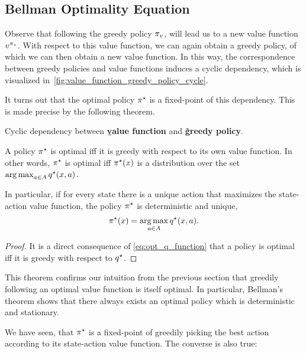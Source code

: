 \subsection{Bellman Optimality Equation}

Observe that following the greedy policy $\pi_{\fnv}$, will lead us to a new value function $\fnv[\pi_{\fnv}]$.
With respect to this value function, we can again obtain a greedy policy, of which we can then obtain a new value function.
In this way, the correspondence between greedy policies and value functions induces a cyclic dependency, which is visualized in~\cref{fig:value_function_greedy_policy_cycle}.

It turns out that the optimal policy $\pi^\star$ is a fixed-point of this dependency.
This is made precise by the following theorem.

\begin{marginfigure}
  \caption{Cyclic dependency between \textbf{\b{value function}} and \textbf{\r{greedy policy}}.}\label{fig:value_function_greedy_policy_cycle}
\end{marginfigure}

\begin{thm}
  A policy $\pi^\star$ is optimal iff it is greedy with respect to its own value function.
  In other words, $\pi^\star$ is optimal iff $\pi^\star(x)$ is a distribution over the set $\argmax_{a \in \sA} \q*{x}{a}$.
\end{thm}

In particular, if for every state there is a unique action that maximizes the state-action value function, the policy $\pi^\star$ is deterministic and unique, \begin{align}
  \pis(x) = \argmax_{a \in \sA} \q*{x}{a}. \label{eq:bop1}
\end{align}

\begin{proof}
  It is a direct consequence of \cref{eq:opt_q_function} that a policy is optimal iff it is greedy with respect to $\fnq[\star]$.
\end{proof}

This theorem confirms our intuition from the previous section that greedily following an optimal value function is itself optimal.
In particular, Bellman's theorem shows that there always exists an optimal policy which is deterministic and stationary.

We have seen, that $\pi^\star$ is a fixed-point of greedily picking the best action according to its state-action value function.
The converse is also true:

